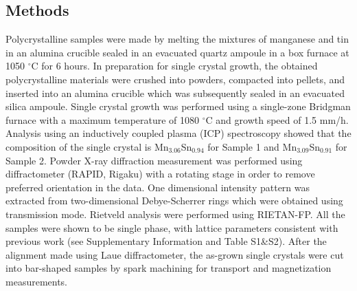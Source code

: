 \documentclass[amsmath,amssymb]{nature}
\begin{document}


\subsection{Methods}
Polycrystalline samples were made by melting the mixtures of manganese and tin in an alumina crucible sealed in an evacuated quartz ampoule in a box furnace at 1050 $^\circ$C for 6 hours. In preparation for single crystal growth, the obtained polycrystalline materials were crushed into powders, compacted into pellets, and inserted into an alumina crucible which was subsequently sealed in an evacuated silica ampoule. Single crystal growth was performed using a single-zone Bridgman furnace with a maximum temperature of 1080 $^\circ$C and growth speed of 1.5 mm/h. Analysis using an inductively coupled plasma (ICP) spectroscopy showed that the composition of the single crystal is Mn$_{3.06}$Sn$_{0.94}$ for Sample 1 and Mn$_{3.09}$Sn$_{0.91}$ for Sample 2. Powder X-ray diffraction measurement was performed using diffractometer (RAPID, Rigaku) with a rotating stage in order to remove preferred orientation in the data. One dimensional intensity pattern was extracted from two-dimensional Debye-Scherrer rings which were obtained using transmission mode. Rietveld analysis were performed using RIETAN-FP. All the samples were shown to be single phase, with lattice parameters consistent with previous work \color{black} (see Supplementary Information and Table S1\&S2).  After the alignment made using Laue diffractometer, the as-grown single crystals were cut into bar-shaped samples by spark machining for transport and magnetization measurements.
\end{document}
